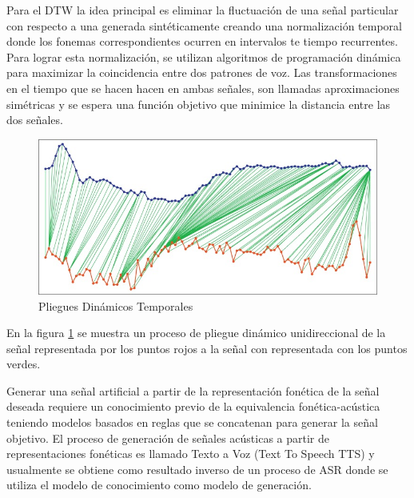 Para el DTW la idea principal es eliminar la fluctuación de una señal particular con respecto a una generada sintéticamente creando una normalización temporal donde los fonemas correspondientes ocurren en intervalos te tiempo recurrentes. Para lograr esta normalización, se utilizan algoritmos de programación dinámica para maximizar la coincidencia entre dos patrones de voz. Las transformaciones en el tiempo que se hacen hacen  en ambas señales, son llamadas aproximaciones simétricas y se espera una función objetivo que minimice la distancia entre las dos señales.

\begin{figure}[H]

\centering
\caption{Pliegues Dinámicos Temporales \cite{Zhang2017DynamicLength}}
\label{img:dtw}
\includegraphics[scale=0.50]{images/dtw.jpg}
\end{figure}

En la figura \ref{img:dtw} se muestra un proceso de pliegue dinámico unidireccional de la señal representada por los puntos rojos a la señal con representada con los puntos verdes.

Generar una señal artificial a partir de la representación fonética de la señal deseada requiere un conocimiento previo de la equivalencia fonética-acústica teniendo modelos basados en reglas que se concatenan para generar la señal objetivo. El proceso de generación de señales acústicas a partir de representaciones fonéticas es llamado Texto a Voz (Text To Speech TTS) y usualmente se obtiene como resultado inverso de un proceso de ASR donde se utiliza el modelo de conocimiento como modelo de generación.

